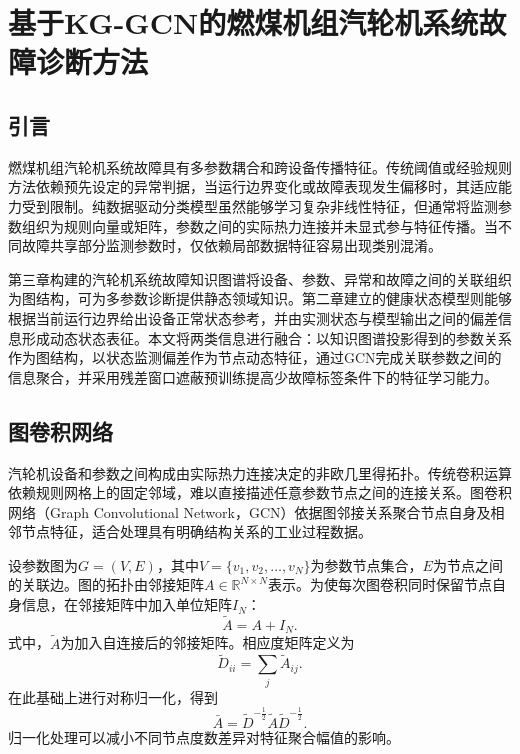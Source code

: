 \section{基于KG-GCN的燃煤机组汽轮机系统故障诊断方法}
\label{sec:kg_gcn_v7}

\subsection{引言}

燃煤机组汽轮机系统故障具有多参数耦合和跨设备传播特征。传统阈值或经验规则方法依赖预先设定的异常判据，当运行边界变化或故障表现发生偏移时，其适应能力受到限制。纯数据驱动分类模型虽然能够学习复杂非线性特征，但通常将监测参数组织为规则向量或矩阵，参数之间的实际热力连接并未显式参与特征传播。当不同故障共享部分监测参数时，仅依赖局部数据特征容易出现类别混淆。

第三章构建的汽轮机系统故障知识图谱将设备、参数、异常和故障之间的关联组织为图结构，可为多参数诊断提供静态领域知识。第二章建立的健康状态模型则能够根据当前运行边界给出设备正常状态参考，并由实测状态与模型输出之间的偏差信息形成动态状态表征。本文将两类信息进行融合：以知识图谱投影得到的参数关系作为图结构，以状态监测偏差作为节点动态特征，通过GCN完成关联参数之间的信息聚合，并采用残差窗口遮蔽预训练提高少故障标签条件下的特征学习能力。

\subsection{图卷积网络}
\label{subsec:gcn_theory_v7}

汽轮机设备和参数之间构成由实际热力连接决定的非欧几里得拓扑。传统卷积运算依赖规则网格上的固定邻域，难以直接描述任意参数节点之间的连接关系。图卷积网络（Graph Convolutional Network，GCN）依据图邻接关系聚合节点自身及相邻节点特征，适合处理具有明确结构关系的工业过程数据\cite{Kipf2017GCN}。

设参数图为$G=(V,E)$，其中$V=\{v_1,v_2,\ldots,v_N\}$为参数节点集合，$E$为节点之间的关联边。图的拓扑由邻接矩阵$A\in\mathbb R^{N\times N}$表示。为使每次图卷积同时保留节点自身信息，在邻接矩阵中加入单位矩阵$I_N$：
\begin{equation}
\tilde A=A+I_N.
\end{equation}
式中，$\tilde A$为加入自连接后的邻接矩阵。相应度矩阵定义为
\begin{equation}
\tilde D_{ii}=\sum_j\tilde A_{ij}.
\end{equation}
在此基础上进行对称归一化，得到
\begin{equation}
\bar A=\tilde D^{-\frac{1}{2}}\tilde A\tilde D^{-\frac{1}{2}}.
\end{equation}
归一化处理可以减小不同节点度数差异对特征聚合幅值的影响。

